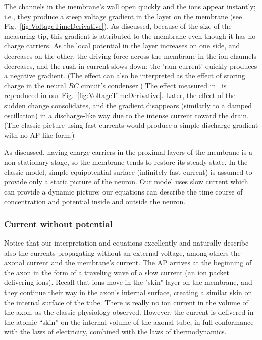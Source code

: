 The channels in the membrane's wall open quickly and the ions appear
instantly; i.e., they produce a steep voltage gradient in the layer
on the membrane (see Fig.~\ref{fig:VoltageTimeDerivative}). As discussed,
because of the size of the measuring tip, this gradient is attributed
to the membrane even though it has no charge carriers. As the local
potential in the layer increases on one side, and decreases on the
other, the driving force across the membrane in the ion channels decreases,
and the rush-in current slows down; the 'ram current' quickly produces
a negative gradient. (The effect can also be interpreted as the effect
of storing charge in the neural $RC$ circuit's condenser.) The effect
measured in~\cite{BeanActionPotential:2007} is reproduced in our
Fig.~\ref{fig:VoltageTimeDerivative}. Later, the effect of the sudden
change consolidates, and the gradient disappears (similarly to a damped
oscillation) in a discharge-like way due to the intense current toward
the drain. (The classic picture using fast currents would produce
a simple discharge gradient with no %
AP-like form.)

As discussed, having charge carriers in the proximal layers of the
membrane is a non-stationary stage, so the membrane tends to restore
its steady state. In the classic model, simple equipotential surface
(infinitely fast current) is assumed to provide only a static picture
of the neuron. Our model uses slow current which can provide a dynamic
picture: our equations can describe the time course of concentration
and potential inside and outside the neuron.


\subsubsection[Without potential]{Current without potential\label{sec:Physics-Current-Without}}

 
Notice that our interpretation and equations excellently and naturally
describe also the currents propagating without an external voltage, among others the axonal current and the membrane's current.
The \gls{AP} arrives at the beginning of the axon in the form of a traveling wave of a  slow current (an ion packet delivering ions). Recall that ions move in the "skin"
layer on the membrane, and they continue their way in the axon's internal
surface, creating a similar skin on the internal surface of the tube.
There is really no ion current in the volume of the axon, as the classic
physiology observed. However, the current is delivered in the atomic ``skin''
on the internal volume of the axonal tube, in full conformance with the laws of electricity, combined with the laws of thermodynamics. 


